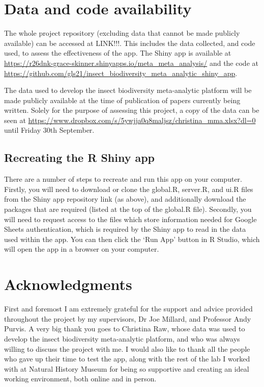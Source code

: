 \documentclass[11pt]{article}
\begin{document}
		\clearpage 
		
		\section{Data and code availability}
		The whole project repository (excluding data that cannot be made publicly available) can be accessed at LINK!!!. This includes the data collected, and code used, to assess the effectiveness of the app. The Shiny app is available at \url{https://r26dnk-grace-skinner.shinyapps.io/meta_meta_analysis/} and the code at \url{https://github.com/gls21/insect_biodiversity_meta_analytic_shiny_app}. 
		
		\noindent The data used to develop the insect biodiversity meta-analytic platform will be made publicly available at the time of publication of papers currently being written. Solely for the purpose of assessing this project, a copy of the data can be seen at \url{https://www.dropbox.com/s/5ywjja0q8maljsz/christina_mma.xlsx?dl=0} until Friday 30th September. 
		
		\subsection{Recreating the R Shiny app}
		There are a number of steps to recreate and run this app on your computer. Firstly, you will need to download or clone the global.R, server.R, and ui.R files from the Shiny app repository link (as above), and additionally download the packages that are required (listed at the top of the global.R file). Secondly, you will need to request access to the files which store information needed for Google Sheets authentication, which is required by the Shiny app to read in the data used within the app. You can then click the ‘Run App’ button in R Studio, which will open the app in a browser on your computer.
		
		\clearpage
		
	\section{Acknowledgments}	
		First and foremost I am extremely grateful for the support and advice provided throughout the project by my supervisors, Dr Joe Millard, and Professor Andy Purvis. A very big thank you goes to Christina Raw, whose data was used to develop the insect biodiversity meta-analytic platform, and who was always willing to discuss the project with me. I would also like to thank all the people who gave up their time to test the app, along with the rest of the lab I worked with at Natural History Museum for being so supportive and creating an ideal working environment, both online and in person. 
	
	\clearpage
	
	

	
	
\end{document}
